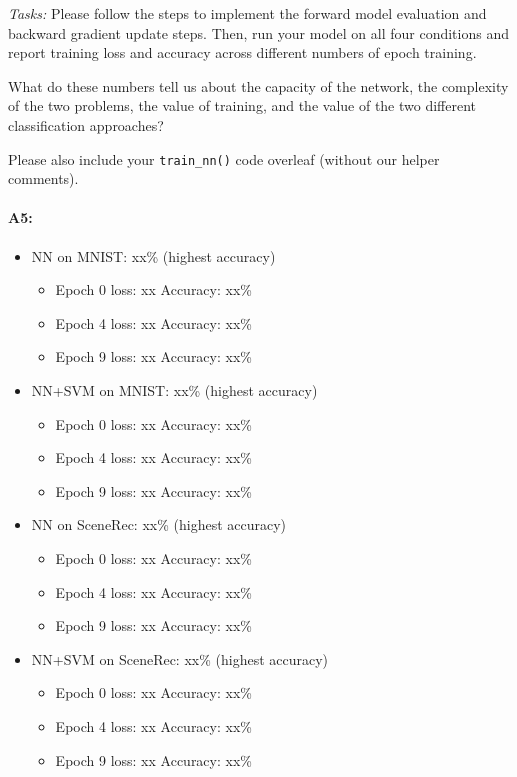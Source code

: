 \emph{Tasks:} Please follow the steps to implement the forward model evaluation and backward gradient update steps. Then, run your model on all four conditions and report training loss and accuracy across different numbers of epoch training. 

What do these numbers tell us about the capacity of the network, the complexity of the two problems, the value of training, and the value of the two different classification approaches?

Please also include your \texttt{train\_nn()} code overleaf (without our helper comments).
\paragraph{A5:}

\begin{itemize}
\item NN on MNIST: xx\% (highest accuracy)
	\begin{itemize}
	\item Epoch 0 loss: xx     Accuracy: xx\%
	\item Epoch 4 loss: xx     Accuracy: xx\%
	\item Epoch 9 loss: xx     Accuracy: xx\%
	\end{itemize}
\item NN+SVM on MNIST: xx\% (highest accuracy)
	\begin{itemize}
	\item Epoch 0 loss: xx     Accuracy: xx\%
	\item Epoch 4 loss: xx     Accuracy: xx\%
	\item Epoch 9 loss: xx     Accuracy: xx\%
	\end{itemize}
\item NN on SceneRec: xx\% (highest accuracy)
	\begin{itemize}
	\item Epoch 0 loss: xx     Accuracy: xx\%
	\item Epoch 4 loss: xx     Accuracy: xx\%
	\item Epoch 9 loss: xx     Accuracy: xx\%
	\end{itemize}
\item NN+SVM on SceneRec: xx\% (highest accuracy)
	\begin{itemize}
	\item Epoch 0 loss: xx     Accuracy: xx\%
	\item Epoch 4 loss: xx     Accuracy: xx\%
	\item Epoch 9 loss: xx     Accuracy: xx\%
	\end{itemize}
\end{itemize}


